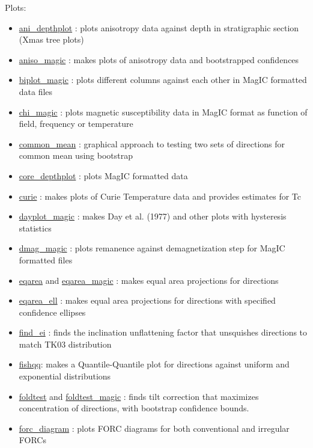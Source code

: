 \documentclass[11pt]{book}
\begin{document}
{{\begin{itemize}
  \end{itemize}

Plots:

\begin{itemize}

  \item \href{http://pmagpy.github.io/PmagPy.html#ani_depthplot}{ani\_depthplot} : plots anisotropy data against depth in stratigraphic section (Xmas tree plots)
\item \href{http://pmagpy.github.io/PmagPy.html#aniso_magic}{aniso\_magic} : makes plots of anisotropy data and bootstrapped confidences
\item \href{http://pmagpy.github.io/PmagPy.html#biplot_magic}{biplot\_magic} : plots different columns against each other in MagIC formatted data files
\item \href{http://pmagpy.github.io/PmagPy.html#chi_magic}{chi\_magic} : plots magnetic susceptibility data in MagIC format as function of field, frequency or temperature
\item \href{http://pmagpy.github.io/PmagPy.html#common_mean}{common\_mean} : graphical approach to testing two sets of directions for common mean using bootstrap
\item \href{http://pmagpy.github.io/PmagPy.html#core_depthplot}{core\_depthplot} : plots MagIC formatted data
\item \href{http://pmagpy.github.io/PmagPy.html#curie}{curie} : makes plots of Curie Temperature data and provides estimates for Tc
\item \href{http://pmagpy.github.io/PmagPy.html#dayplot}{dayplot\_magic} : makes Day et al. (1977) and other plots with hysteresis statistics
\item \href{http://pmagpy.github.io/PmagPy.html#dmag_magic}{dmag\_magic} : plots remanence against demagnetization step for MagIC formatted files
\item \href{http://pmagpy.github.io/PmagPy.html#eqarea}{eqarea} and \href{http://pmagpy.github.io/PmagPy.html#eqarea_magic}{eqarea\_magic} : makes equal area projections for directions
\item \href{http://pmagpy.github.io/PmagPy.html#eqarea_ell}{eqarea\_ell} : makes equal area projections for directions with specified confidence ellipses
\item \href{http://pmagpy.github.io/PmagPy.html#find_ei}{find\_ei} : finds the inclination unflattening factor that unsquishes directions to match TK03 distribution
\item \href{http://pmagpy.github.io/PmagPy.html#fishqq}{fishqq}: makes a Quantile-Quantile plot for directions against uniform and exponential distributions
\item \href{http://pmagpy.github.io/PmagPy.html#foldtest}{foldtest} and \href{http://pmagpy.github.io/PmagPy.html#foldtest_magic}{foldtest\_magic} : finds  tilt correction that maximizes concentration of directions, with bootstrap confidence bounds.
  \item \href{http://pmagpy.github.io/PmagPy.html#forc_diagram}{forc\_diagram} : plots FORC diagrams for both conventional and irregular FORCs


\end{itemize}}}
\end{document}
